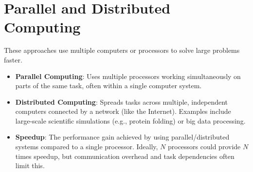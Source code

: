 \documentclass[11pt,oneside]{book}
\begin{document}
\section{Parallel and Distributed Computing}
\label{sec:parallel_distributed}
These approaches use multiple computers or processors to solve large problems faster.
\begin{itemize}
    \item \textbf{Parallel Computing}: Uses multiple processors working simultaneously on parts of the same task, often within a single computer system.
    \item \textbf{Distributed Computing}: Spreads tasks across multiple, independent computers connected by a network (like the Internet). Examples include large-scale scientific simulations (e.g., protein folding) or big data processing.
    \item \textbf{Speedup}: The performance gain achieved by using parallel/distributed systems compared to a single processor. Ideally, $N$ processors could provide $N$ times speedup, but communication overhead and task dependencies often limit this.
\end{itemize}
\end{document}

